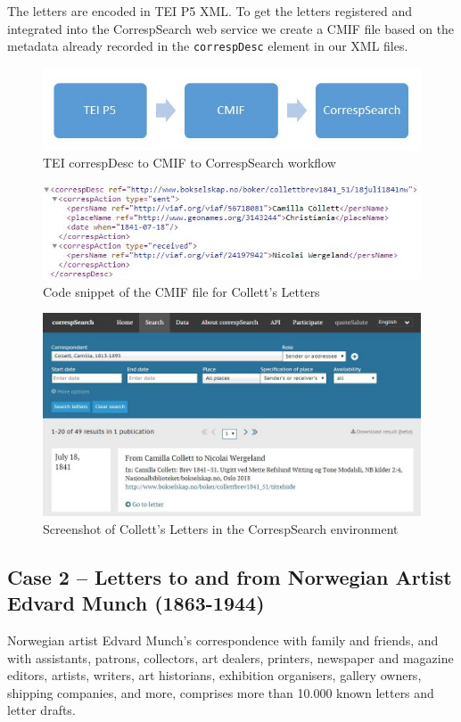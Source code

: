 \documentclass[runningheads]{llncs}
\begin{document}
The letters are encoded in TEI P5 XML. To get the letters registered and
integrated into the CorrespSearch web service we create a CMIF file
based on the metadata already recorded in the \texttt{correspDesc}
element in our XML files.

\begin{figure}[h!]
\centering
\includegraphics[width=\textwidth]{TEI-CMIF.jpg}
\caption{TEI correspDesc to CMIF  to CorrespSearch workflow} \label{fig2}
\end{figure}

\begin{figure}[h!]
\centering
\includegraphics[width=\textwidth]{correspDesc.jpg}
\caption{Code snippet of the CMIF file for Collett's Letters} \label{fig3}
\end{figure}

\begin{figure}[h!]
\centering
\includegraphics[width=\textwidth]{CC_CS.jpg}
\caption{Screenshot of Collett's Letters in the CorrespSearch environment} \label{fig4}
\end{figure}

\clearpage
\subsection{Case 2 -- Letters to and from Norwegian Artist Edvard
Munch (1863-1944)}
Norwegian artist Edvard Munch's correspondence with family and friends,
and with assistants, patrons, collectors, art dealers, printers,
newspaper and magazine editors, artists, writers, art historians,
exhibition organisers, gallery owners, shipping companies, and more,
comprises more than 10.000 known letters and letter drafts.
\end{document}
